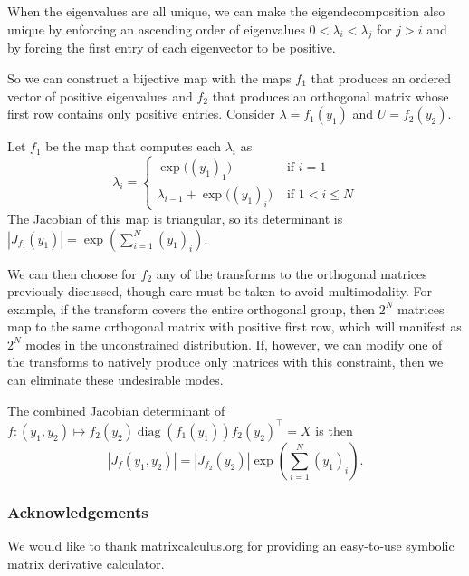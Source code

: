 \documentclass[11pt]{article}
\newcommand{\abs}[1]{\left| #1 \right|}
\newcommand{\absdet}[1]{\abs{#1}}
\begin{document}
When the eigenvalues are all unique, we can make the eigendecomposition also unique by enforcing an ascending order of eigenvalues $0 < \lambda_i < \lambda_j$ for $j > i$ and by forcing the first entry of each eigenvector to be positive.

So we can construct a bijective map with the maps $f_1$ that produces an ordered vector of positive eigenvalues and $f_2$ that produces an orthogonal matrix whose first row contains only positive entries.
Consider $\lambda = f_1(y_1)$ and $U = f_2(y_2)$.

Let $f_1$ be the map that computes each $\lambda_i$ as
\[
  \lambda_i = \begin{cases}
   \exp\bigl((y_1)_1\bigr) &\text{ if } i = 1\\
    \lambda_{i-1} + \exp\bigl((y_1)_i\bigr) &\text{ if } 1 < i \le N
  \end{cases}
\]
The Jacobian of this map is triangular, so its determinant is $\absdet{J_{f_1}(y_1)} = \exp\left(\sum_{i=1}^N (y_1)_i\right)$.

We can then choose for $f_2$ any of the transforms to the orthogonal matrices previously discussed, though care must be taken to avoid multimodality.
For example, if the transform covers the entire orthogonal group, then $2^N$ matrices map to the same orthogonal matrix with positive first row, which will manifest as $2^N$ modes in the unconstrained distribution.
If, however, we can modify one of the transforms to natively produce only matrices with this constraint, then we can eliminate these undesirable modes.

The combined Jacobian determinant of $f: (y_1, y_2) \mapsto f_2(y_2) \operatorname{diag}(f_1(y_1)) f_2(y_2)^\top = X$ is then 
\[ \absdet{J_{f}(y_1, y_2)} = \absdet{J_{f_2}(y_2)} \exp\left(\sum_{i=1}^N (y_1)_i\right).\]



\subsubsection*{Acknowledgements}

We would like to thank \url{matrixcalculus.org} for providing an
easy-to-use symbolic matrix derivative calculator.



{}

\end{document}

